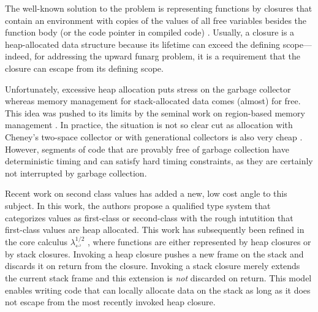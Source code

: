 \documentclass[sigplan,review,dvipsnames,screen,10pt]{acmart}
\newcommand{\LamWhatif}{\ensuremath{\lambda^{1/2}_{\hookleftarrow}}}
\begin{document}
The well-known solution to the problem is representing functions by
closures that contain an environment with copies of the values of all
free variables besides the function body (or the code pointer in
compiled code) \cite{landin66,DBLP:conf/acm/Reynolds72}.
Usually, a closure is a heap-allocated data structure because its
lifetime can exceed the defining scope---indeed, for addressing the
upward funarg problem, it is a requirement that the closure can escape
from its defining scope.

Unfortunately, excessive heap allocation puts stress on the garbage
collector whereas memory management for stack-allocated data comes
(almost) for free. This idea was pushed to its limits by the seminal work on
region-based memory management
\cite{DBLP:conf/popl/TofteT94,DBLP:journals/iandc/TofteT97}. In
practice, the situation is not so clear cut as allocation with
Cheney's two-space collector or with generational collectors is also
very cheap \cite{DBLP:journals/jfp/AppelS96}. However, segments of code that are provably free of
garbage collection have deterministic timing and can satisfy hard
timing constraints, as they are certainly not interrupted by garbage
collection. 

Recent work on second class values
\cite{DBLP:conf/oopsla/OsvaldEWAR16} has
added a new, low cost angle to this subject. In this work, the authors
propose a qualified type system that categorizes values as first-class
or second-class with the rough intutition that first-class values are
heap allocated. This work has subsequently been refined in the core
calculus $\LamWhatif$
\cite{DBLP:conf/ecoop/XhebrajB0R22}, where functions are
either represented by heap closures or by stack closures. Invoking a
heap closure pushes a new frame on the stack and discards it on return from the
closure. Invoking a stack closure merely extends the current stack
frame and this extension is \emph{not} discarded on return.
This model enables writing code that can locally allocate data on the
stack as long as it does not escape from the most recently invoked
heap closure.
\end{document}
